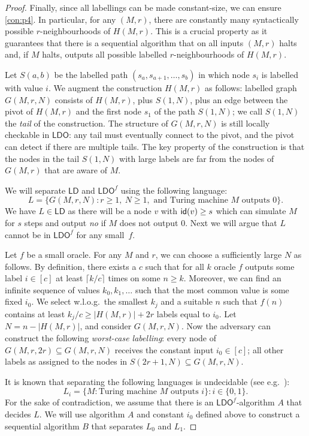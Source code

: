 \documentclass[11pt,a4paper]{article}
\theoremstyle{definition}
\theoremstyle{remark}
\newcommand{\ldo}{\mathsf{LDO}}
\newcommand{\ld}{\mathsf{LD}}
\newcommand{\id}{\text{\sf id}}
\begin{document}
\begin{proof}
Finally, since all labellings can be made constant-size, we can ensure \ref{con:p4}. In particular, for any $(M,r)$, there are constantly many syntactically possible $r$-neighbourhoods of $H(M,r)$. This is a crucial property as it guarantees that there is a sequential algorithm that on all inputs $(M,r)$ halts and, if $M$ halts, outputs all possible labelled $r$-neighbourhoods of $H(M,r)$.

Let $S(a,b)$ be the labelled path $(s_a, s_{a+1}, \dots, s_b)$ in which node $s_i$ is labelled with value $i$. We augment the construction $H(M,r)$ as follows: labelled graph $G(M,r,N)$ consists of $H(M,r)$, plus $S(1,N)$, plus an edge between the pivot of $H(M,r)$ and the first node $s_1$ of the path $S(1,N)$; we call $S(1,N)$ the \emph{tail} of the construction. The structure of $G(M,r,N)$ is still locally checkable in $\ldo$: any tail must eventually connect to the pivot, and the pivot can detect if there are multiple tails. The key property of the construction is that the nodes in the tail $S(1,N)$ with large labels are far from the nodes of $G(M,r)$ that are aware of $M$.

We will separate $\ld$ and $\ldo^f$ using the following language:
\[
    L = \{ G(M, r, N) : r \ge 1,\ N \ge 1, \text{ and Turing machine } M \text{ outputs } 0 \}.
\]
We have $L \in \ld$ as there will be a node $v$ with $\id(v) \ge s$ which can simulate $M$ for $s$ steps and output \emph{no} if $M$ does not output $0$. Next we will argue that $L$ cannot be in $\ldo^f$ for any small~$f$.

Let $f$ be a small oracle. For any $M$ and $r$, we can choose a sufficiently large $N$ as follows. By definition, there exists a $c$ such that for all $k$ oracle $f$ outputs some label $i \in [c]$ at least $\lceil k/c \rceil$ times on some $n \ge k$. Moreover, we can find an infinite sequence of values $k_0, k_1, \dots$ such that the most common value is some fixed $i_0$. We select w.l.o.g.\ the smallest $k_j$ and a suitable $n$ such that $f(n)$ contains at least $k_j/c \ge |H(M,r)| + 2r$ labels equal to $i_0$. Let $N = n-|H(M,r)|$, and consider $G(M,r,N)$. Now the adversary can construct the following \emph{worst-case labelling}: every node of $G(M,r,2r) \subseteq G(M,r,N)$ receives the constant input $i_0 \in [c]$; all other labels as assigned to the nodes in $S(2r+1,N) \subseteq G(M,r,N)$.

It is known that separating the following languages is undecidable (see e.g.~\cite[p.~65]{papadimitriou94computational}):
\begin{equation}\label{eq:Li}
L_i = \{ M : \text{Turing machine } M \text{ outputs } i \} : i \in \{0,1\}.
\end{equation}
For the sake of contradiction, we assume that there is an $\ldo^f$-algorithm $A$ that decides $L$. We will use algorithm $A$ and constant $i_0$ defined above to construct a sequential algorithm $B$ that separates $L_0$ and $L_1$.


\end{proof}
\end{document}
